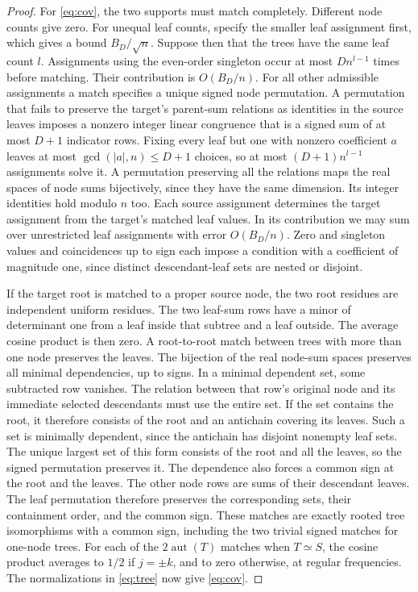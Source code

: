 \documentclass[11pt,letterpaper]{article}
\newcommand{\aut}{\operatorname{aut}}
\newcommand{\abs}[1]{\lvert #1\rvert}
\begin{document}
\begin{proof}
For \eqref{eq:cov}, the two supports must match completely. Different
node counts give zero. For unequal leaf counts, specify the smaller
leaf assignment first, which gives a bound \(B_D/\sqrt n\). Suppose
then that the trees have the same leaf count \(l\). Assignments using
the even-order singleton occur at most \(Dn^{l-1}\) times before
matching. Their contribution is \(O(B_D/n)\). For all other admissible
assignments a match specifies a unique signed node permutation.
A permutation that fails to preserve the target's parent-sum relations
as identities in the source leaves imposes a nonzero integer linear
congruence that is a signed sum of at most \(D+1\) indicator rows.
Fixing every leaf but one with nonzero coefficient \(a\) leaves
at most \(\gcd(\abs a,n)\le D+1\) choices, so at most
\((D+1)n^{l-1}\) assignments solve it. A permutation preserving all
the relations maps the real spaces of node sums bijectively, since
they have the same dimension. Its integer identities hold modulo
\(n\) too. Each source assignment determines the target assignment
from the target's matched leaf values. In its contribution we may
sum over unrestricted leaf assignments with error \(O(B_D/n)\).
Zero and singleton values and coincidences up to sign each impose a condition
with a coefficient of magnitude one, since distinct descendant-leaf
sets are nested or disjoint.

If the target root is matched to a proper source node, the two root
residues are independent uniform residues. The two leaf-sum rows have
a minor of determinant one from a leaf inside that subtree and a
leaf outside. The average cosine product is then zero.
A root-to-root match between trees with more than one node preserves
the leaves. The bijection of the real node-sum spaces preserves all
minimal dependencies, up to signs. In a minimal dependent set,
some subtracted row vanishes.
The relation between that row's original node and its immediate
selected descendants must use the entire set. If the set contains
the root, it therefore consists of the root and an antichain covering
its leaves. Such a set is minimally dependent, since the antichain
has disjoint nonempty leaf sets. The unique largest set of this form
consists of the root and all the leaves, so the signed permutation
preserves it. The dependence also forces a common sign at the root
and the leaves. The other node rows are sums of their descendant
leaves. The leaf permutation therefore preserves the corresponding
sets, their containment order, and the common sign. These matches are
exactly rooted tree isomorphisms with a common sign, including the
two trivial signed matches for one-node trees. For each of the
\(2\aut(T)\) matches when \(T\simeq S\), the cosine product averages to
\(1/2\) if \(j=\pm k\), and to zero otherwise, at regular frequencies.
The normalizations in \eqref{eq:tree} now give \eqref{eq:cov}.
\end{proof}
\end{document}
